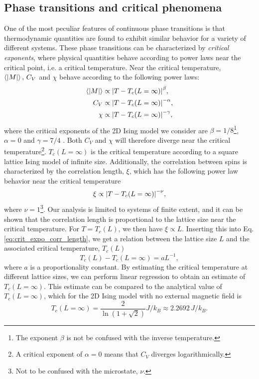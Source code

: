 \subsection{Phase transitions and critical phenomena}\label{subsec_theory:PT_critical_phenomena}
One of the most peculiar features of continuous phase transitions is that thermodynamic quantities are found to exhibit similar behavior for a variety of different systems. These phase transitions can be characterized by \textit{critical exponents}, where physical quantities behave according to power laws near the critical point, i.e. a critical temperature. Near the critical temperature, $\expval{\abs{M}},\,C_V$ and $\chi$ behave according to the following power laws: 
\begin{align}
    \expval{\abs{M}} & \propto \abs{T - T_c(L=\infty)}^\beta, \label{eq:crit_expo_mag} \\
    C_V & \propto \abs{T - T_c(L=\infty)}^{-\alpha}, \label{eq:crit_expo_heatcap} \\ 
    \chi & \propto \abs{T - T_c(L=\infty)}^{-\gamma}, \label{eq:crit_expo_mag_susc}
\end{align}
where the critical exponents of the 2D Ising model we consider are $\beta=1/8$\footnote{The exponent $\beta$ is not be confused with the inverse temperature.}, $\alpha=0$ and $\gamma=7/4$ \cite{crit_expo}. Both $C_V$ and $\chi$ will therefore diverge near the critical temperature\footnote{A critical exponent of $\alpha=0$ means that $C_V$ diverges logarithmically.}. $T_c(L=\infty)$ is the critical temperature according to a square lattice Ising model of infinite size. Additionally, the correlation between spins is characterized by the correlation length, $\xi$, which has the following power law behavior near the critical temperature 
\begin{equation}
    \xi \propto \abs{T - T_c(L=\infty)}^{-\nu}, \label{eq:crit_expo_corr_length}
\end{equation}
where $\nu=1$\footnote{Not to be confused with the microstate, $\nu$.}. Our analysis is limited to systems of finite extent, and it can be shown  that the correlation length is proportional to the lattice size near the critical temperature. For $T=T_c(L)$, we then have $\xi\propto L$. Inserting this into Eq. \eqref{eq:crit_expo_corr_length}, we get a relation between the lattice size $L$ and the associated critical temperature, $T_c(L)$
\begin{equation}
    T_c(L) - T_c(L=\infty) = aL^{-1}, \label{eq:finite_size_scaling_relation}
\end{equation}  
where $a$ is a proportionality constant. By estimating the critical temperature at different lattice sizes, we can perform linear regression to obtain an estimate of $T_c(L=\infty)$. This estimate can be compared to the analytical value of $T_c(L=\infty)$, which for the 2D Ising model with no external magnetic field is \cite{Onsager_Ising2D}
\begin{equation}
    T_c(L=\infty) = \frac{2}{\ln(1+\sqrt{2})} J/k_B \approx 2.2692\,J/k_B. \label{eq:onsager_critical_temperature}
\end{equation}


